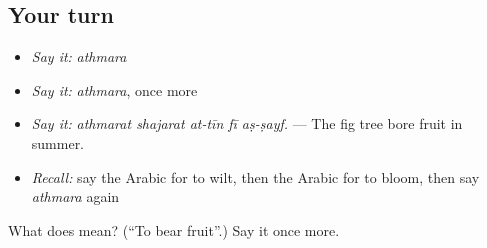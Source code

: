 \subsection*{Your turn}
\begin{itemize}
\raggedright
  \item \emph{Say it:} \emph{athmara}
  \item \emph{Say it:} \emph{athmara}, once more
  \item \emph{Say it:} \emph{athmarat shajarat at-tīn fī aṣ-ṣayf.} — The fig tree bore fruit in summer.
  \item \emph{Recall:} say the Arabic for to wilt, then the Arabic for to bloom, then say \emph{athmara} again
\end{itemize}

\begin{tcolorbox}[breakable,colback=teal!4,colframe=teal!35!black,title={Before you move on}]
What does  mean? (\textquotedblleft{}To bear fruit\textquotedblright{}.) Say it once more.
\end{tcolorbox}
